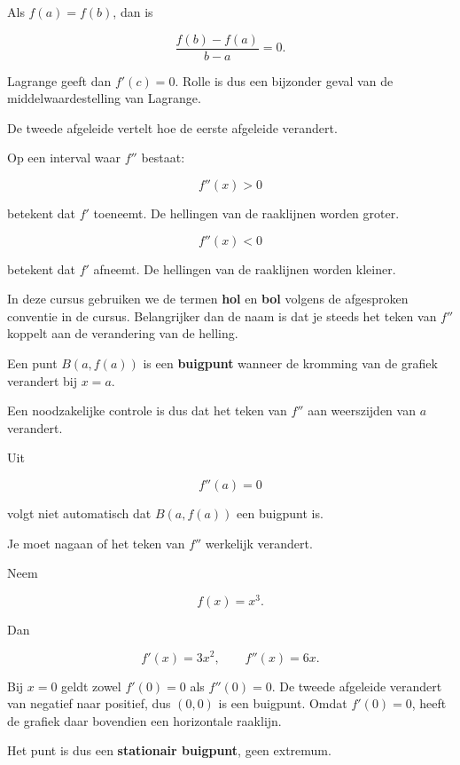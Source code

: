 \documentclass{ximera}
\begin{document}
\begin{opmerking}
Als \(f(a)=f(b)\), dan is

\[
\frac{f(b)-f(a)}{b-a}=0.
\]

Lagrange geeft dan \(f'(c)=0\). Rolle is dus een bijzonder geval van
de middelwaardestelling van Lagrange.
\end{opmerking}



De tweede afgeleide vertelt hoe de eerste afgeleide verandert.

\begin{eigenschap}[Kromming]
Op een interval waar \(f''\) bestaat:

\[
f''(x)>0
\]

betekent dat \(f'\) toeneemt. De hellingen van de raaklijnen worden groter.

\[
f''(x)<0
\]

betekent dat \(f'\) afneemt. De hellingen van de raaklijnen worden kleiner.
\end{eigenschap}

In deze cursus gebruiken we de termen \textbf{hol} en \textbf{bol}
volgens de afgesproken conventie in de cursus. Belangrijker dan de naam
is dat je steeds het teken van \(f''\) koppelt aan de verandering van de
helling.

\begin{definitie}[Buigpunt]
Een punt \(B(a,f(a))\) is een \textbf{buigpunt} wanneer de kromming van
de grafiek verandert bij \(x=a\).

Een noodzakelijke controle is dus dat het teken van \(f''\) aan
weerszijden van \(a\) verandert.
\end{definitie}

\begin{opmerking}
Uit

\[f''(a)=0\]

volgt niet automatisch dat \(B(a,f(a))\) een buigpunt is.

Je moet nagaan of het teken van \(f''\) werkelijk verandert.
\end{opmerking}

\begin{voorbeeld}
Neem

\[f(x)=x^3.\]

Dan

\[f'(x)=3x^2,\qquad f''(x)=6x.\]

Bij \(x=0\) geldt zowel \(f'(0)=0\) als \(f''(0)=0\).
De tweede afgeleide verandert van negatief naar positief, dus \((0,0)\)
is een buigpunt. Omdat \(f'(0)=0\), heeft de grafiek daar bovendien een
horizontale raaklijn.

Het punt is dus een \textbf{stationair buigpunt}, geen extremum.
\end{voorbeeld}
\end{document}
